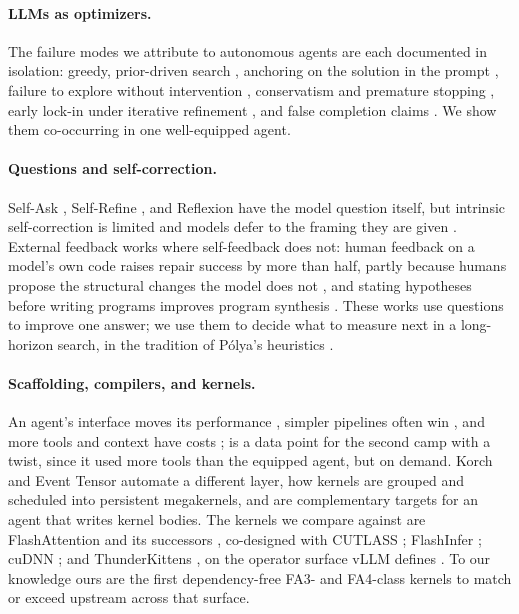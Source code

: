 \paragraph{LLMs as optimizers.} The failure modes we attribute to autonomous agents are each
documented in isolation: greedy, prior-driven search
\cite{redko2026priorknowledge,dong2025stark,li2025tritonforge}, anchoring on the solution in the
prompt \cite{jones2022cognitivebiases}, failure to explore without intervention
\cite{krishnamurthy2024explore}, conservatism and premature stopping \cite{merouani2025compilot},
early lock-in under iterative refinement \cite{javaji2025turnwise}, and false completion claims
\cite{advani2026falsesuccess}. We show them co-occurring in one well-equipped agent.

\paragraph{Questions and self-correction.} Self-Ask \cite{press2023selfask}, Self-Refine
\cite{madaan2023selfrefine}, and Reflexion \cite{shinn2023reflexion} have the model question itself,
but intrinsic self-correction is limited \cite{huang2024cannotselfcorrect} and models defer to the
framing they are given \cite{sharma2024sycophancy}. External feedback works where self-feedback does
not: human feedback on a model's own code raises repair success by more than half, partly because
humans propose the structural changes the model does not \cite{olausson2024selfrepair}, and stating
hypotheses before writing programs improves program synthesis \cite{wang2024hypothesissearch}. These
works use questions to improve one answer; we use them to decide what to measure next in a
long-horizon search, in the tradition of P\'olya's heuristics \cite{polya1945howtosolveit}.

\paragraph{Scaffolding, compilers, and kernels.} An agent's interface moves its performance
\cite{yang2024sweagent}, simpler pipelines often win \cite{xia2024agentless,anthropic2024effectiveagents},
and more tools and context have costs \cite{langchain2025toolload,liu2024lost}; \KernelSeek is a data point
for the second camp with a twist, since it used more tools than the equipped agent, but on demand. Korch \cite{hu2024korch}
and Event Tensor \cite{jin2026eventtensor} automate a different layer, how kernels are grouped and
scheduled into persistent megakernels, and are complementary targets for an agent that writes
kernel bodies. The kernels we compare against are FlashAttention and its successors
\cite{flashattention,dao2024flashattention2,shah2024flashattention3,zadouri2026flashattention4},
co-designed with CUTLASS \cite{nvidia2023cutlass}; FlashInfer \cite{ye2025flashinfer}; cuDNN
\cite{nvidia2025cudnn}; and ThunderKittens \cite{spector2025thunderkittens}, on the operator surface
vLLM defines \cite{vllm}. To our knowledge ours are the first dependency-free FA3- and
FA4-class kernels to match or exceed upstream across that surface.

